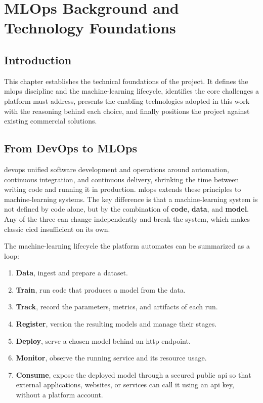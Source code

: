 \chapter{MLOps Background and Technology Foundations}
\label{chap:background}

\section*{Introduction}
This chapter establishes the technical foundations of the project. It defines the
\gls{mlops} discipline and the machine-learning lifecycle, identifies the core
challenges a platform must address, presents the enabling technologies adopted in
this work with the reasoning behind each choice, and finally positions the project
against existing commercial solutions.

\section{From DevOps to MLOps}
\label{sec:devops-to-mlops}
\gls{devops} unified software development and operations around automation,
continuous integration, and continuous delivery, shrinking the time between
writing code and running it in production. \gls{mlops} extends these principles
to machine-learning systems. The key difference is that a machine-learning system
is not defined by code alone, but by the combination of \textbf{code}, \textbf{data},
and \textbf{model}. Any of the three can change independently and break the system,
which makes classic \gls{cicd} insufficient on its own.

The machine-learning lifecycle the platform automates can be summarized as a loop:

\begin{enumerate}[leftmargin=1.6em]
  \item \textbf{Data}, ingest and prepare a dataset.
  \item \textbf{Train}, run code that produces a model from the data.
  \item \textbf{Track}, record the parameters, metrics, and artifacts of each run.
  \item \textbf{Register}, version the resulting models and manage their stages.
  \item \textbf{Deploy}, serve a chosen model behind an \gls{http} endpoint.
  \item \textbf{Monitor}, observe the running service and its resource usage.
  \item \textbf{Consume}, expose the deployed model through a secured public
        \gls{api} so that external applications, websites, or services can call
        it using an \gls{api} key, without a platform account.
\end{enumerate}

